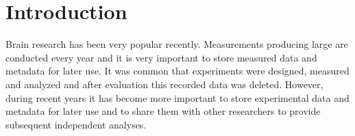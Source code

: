 \documentclass[conference]{IEEEtran}
\begin{document}
%




%
\IEEEpeerreviewmaketitle



\section{Introduction}
Brain research has been very popular recently. Measurements producing large are conducted every year and it is very important to store measured data and metadata for later use. It was common that experiments were designed, measured and analyzed and after evaluation this recorded data was deleted. However, during recent years it has become more important to store experimental data and metadata for later use and to share them with other researchers to provide subsequent independent analyses.
\end{document}
